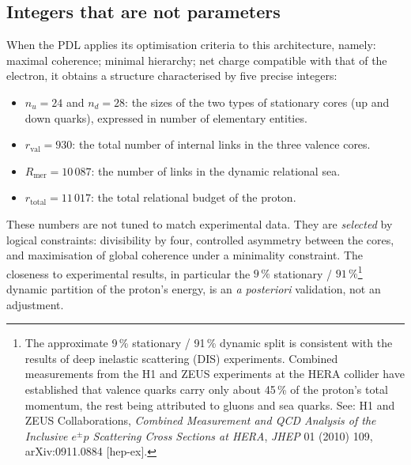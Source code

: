 \documentclass[11pt, a4paper, openright]{book}
\begin{document}
\subsection*{Integers that are not parameters}

When the PDL applies its optimisation criteria to this architecture, namely: maximal coherence; minimal hierarchy; net charge compatible with that of the electron, it obtains a structure characterised by five precise integers:

\begin{itemize}
\item $n_u = 24$ and $n_d = 28$: the sizes of the two types of stationary cores (up and down quarks), expressed in number of elementary entities.
\item $r_{\text{val}} = 930$: the total number of internal links in the three valence cores.
\item $R_{\text{mer}} = 10\,087$: the number of links in the dynamic relational sea.
\item $r_{\text{total}} = 11\,017$: the total relational budget of the proton.
\end{itemize}

These numbers are not tuned to match experimental data. They are \emph{selected} by logical constraints: divisibility by four, controlled asymmetry between the cores, and maximisation of global coherence under a minimality constraint. The closeness to experimental results, in particular the $9\,\%$ stationary / $91\,\%$\footnote{The approximate 9\,\% stationary / 91\,\% dynamic split is consistent with the results of deep inelastic scattering (DIS) experiments. Combined measurements from the H1 and ZEUS experiments at the HERA collider have established that valence quarks carry only about 45\,\% of the proton’s total momentum, the rest being attributed to gluons and sea quarks. See: H1 and ZEUS Collaborations, \textit{Combined Measurement and QCD Analysis of the Inclusive $e^{\pm}p$ Scattering Cross Sections at HERA}, \textit{JHEP} 01 (2010) 109, arXiv:0911.0884 [hep-ex].}
dynamic partition of the proton’s energy, is an \emph{a posteriori} validation, not an adjustment.

\medskip
\end{document}
